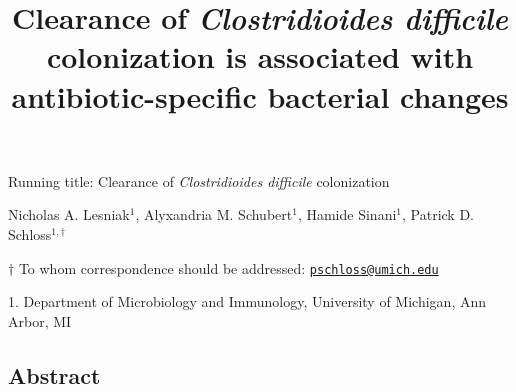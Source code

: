 \documentclass[12pt,]{article}
\title{\textbf{Clearance of \emph{Clostridioides difficile}
colonization is associated with antibiotic-specific bacterial changes}}
\author{}
\date{}
\begin{document}
\maketitle

\vspace{30mm}

Running title: Clearance of \emph{Clostridioides difficile} colonization

\vspace{20mm}

Nicholas A. Lesniak\(^1\), Alyxandria M. Schubert\(^1\), Hamide
Sinani\(^1\), Patrick D. Schloss\(^{1,\dagger}\)

\vspace{30mm}

\(\dagger\) To whom correspondence should be addressed:
\href{mailto:pschloss@umich.edu}{\nolinkurl{pschloss@umich.edu}}

1. Department of Microbiology and Immunology, University of Michigan,
Ann Arbor, MI

\newpage
\linenumbers

\hypertarget{abstract}{%
\subsection{Abstract}\label{abstract}}
\end{document}
